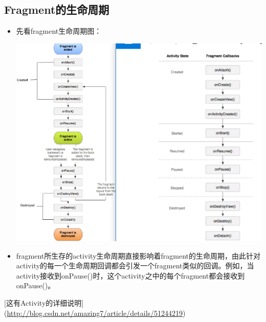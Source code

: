 \documentclass[9pt, b5paper]{article}
\begin{document}
\subsection{Fragment的生命周期}
\label{sec-2-2}
\begin{itemize}
\item 先看fragment生命周期图：

\includegraphics[width=.9\linewidth]{./pic/fragmentlifecycle2.png}
\item fragment所生存的activity生命周期直接影响着fragment的生命周期，由此针对activity的每一个生命周期回调都会引发一个fragment类似的回调。例如，当activity接收到onPause()时，这个activity之中的每个fragment都会接收到onPause()。
\end{itemize}
[这有Activity的详细说明](\url{http://blog.csdn.net/amazing7/article/details/51244219})
\end{document}
